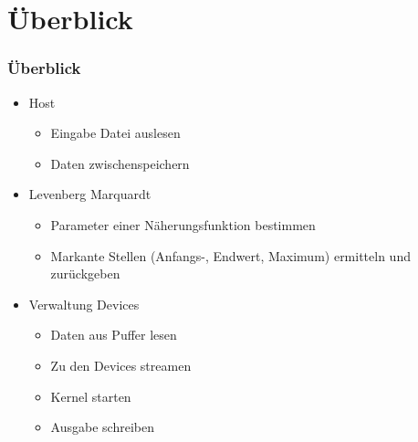 \documentclass[ddcfooter]{tudbeamer}
\begin{document}
\section{Überblick}
\begin{frame}
    \frametitle*{Überblick}
	\begin{itemize}
	\item{Host}
	\begin{itemize}
		\item{Eingabe Datei auslesen}
		\item{Daten zwischenspeichern}
	\end{itemize}
	\item{Levenberg Marquardt}
	\begin{itemize}
		\item{Parameter einer Näherungsfunktion bestimmen}
		\item{Markante Stellen (Anfangs-, Endwert, Maximum) ermitteln und zurückgeben}
	\end{itemize}
	\item{Verwaltung Devices}
	\begin{itemize}
		\item{Daten aus Puffer lesen}
		\item{Zu den Devices streamen}
		\item{Kernel starten}
		\item{Ausgabe schreiben}
	\end{itemize}
	\end{itemize}
\end{frame}
\end{document}
